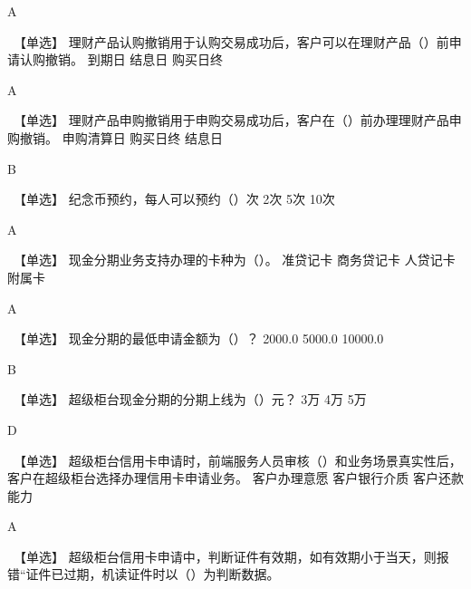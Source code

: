 \documentclass[kindlepaper]{BHCexam4kindle}
\begin{document}
\begin{questions}
\begin{solution} A \end{solution}
\qs　【单选】 理财产品认购撤销用于认购交易成功后，客户可以在理财产品（）前申请认购撤销。 \xx
{} {  到期日 } { 结息日 } { 购买日终 }
\begin{solution} A \end{solution}
\qs　【单选】 理财产品申购撤销用于申购交易成功后，客户在（）前办理理财产品申购撤销。 \xx
{} {  申购清算日 } { 购买日终 } { 结息日 }
\begin{solution} B \end{solution}
\qs　【单选】 纪念币预约，每人可以预约（）次 \xx
{} {  2次 } { 5次 } { 10次 }
\begin{solution} A \end{solution}
\qs　【单选】 现金分期业务支持办理的卡种为（）。 \xx
{} {  准贷记卡 } { 商务贷记卡 } { 人贷记卡附属卡 }
\begin{solution} A \end{solution}
\qs　【单选】 现金分期的最低申请金额为（）？ \xx
{} {  2000.0 } { 5000.0 } { 10000.0 }
\begin{solution} B \end{solution}
\qs　【单选】 超级柜台现金分期的分期上线为（）元？ \xx
{} {  3万 } { 4万 } { 5万 }
\begin{solution} D \end{solution}
\qs　【单选】 超级柜台信用卡申请时，前端服务人员审核（）和业务场景真实性后，客户在超级柜台选择办理信用卡申请业务。 \xx
{} {  客户办理意愿 } { 客户银行介质 } { 客户还款能力 }
\begin{solution} A \end{solution}
\qs　【单选】 超级柜台信用卡申请中，判断证件有效期，如有效期小于当天，则报错“证件已过期，机读证件时以（）为判断数据。 \xx

\end{questions}
\end{document}
